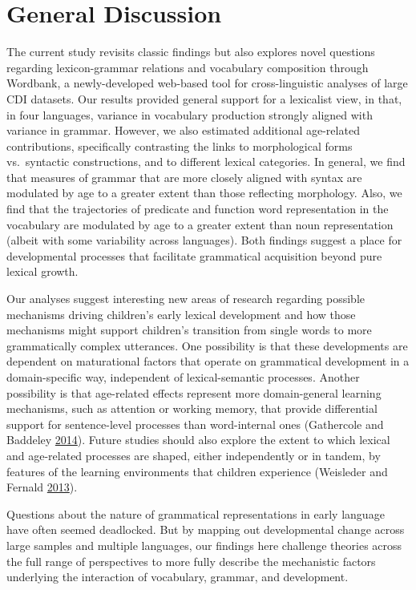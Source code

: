 \documentclass[authoryear, review]{elsarticle}
\begin{document}
\section{General Discussion}\label{general-discussion}

The current study revisits classic findings but also explores novel
questions regarding lexicon-grammar relations and vocabulary composition
through Wordbank, a newly-developed web-based tool for cross-linguistic
analyses of large CDI datasets. Our results provided general support for
a lexicalist view, in that, in four languages, variance in vocabulary
production strongly aligned with variance in grammar. However, we also
estimated additional age-related contributions, specifically contrasting
the links to morphological forms vs.~syntactic constructions, and to
different lexical categories. In general, we find that measures of
grammar that are more closely aligned with syntax are modulated by age
to a greater extent than those reflecting morphology. Also, we find that
the trajectories of predicate and function word representation in the
vocabulary are modulated by age to a greater extent than noun
representation (albeit with some variability across languages). Both
findings suggest a place for developmental processes that facilitate
grammatical acquisition beyond pure lexical growth.

Our analyses suggest interesting new areas of research regarding
possible mechanisms driving children's early lexical development and how
those mechanisms might support children's transition from single words
to more grammatically complex utterances. One possibility is that these
developments are dependent on maturational factors that operate on
grammatical development in a domain-specific way, independent of
lexical-semantic processes. Another possibility is that age-related
effects represent more domain-general learning mechanisms, such as
attention or working memory, that provide differential support for
sentence-level processes than word-internal ones (Gathercole and
Baddeley \hyperref[ref-gathercole2014]{2014}). Future studies should
also explore the extent to which lexical and age-related processes are
shaped, either independently or in tandem, by features of the learning
environments that children experience (Weisleder and Fernald
\hyperref[ref-weisleder2013]{2013}).

Questions about the nature of grammatical representations in early
language have often seemed deadlocked. But by mapping out developmental
change across large samples and multiple languages, our findings here
challenge theories across the full range of perspectives to more fully
describe the mechanistic factors underlying the interaction of
vocabulary, grammar, and development.
\end{document}
